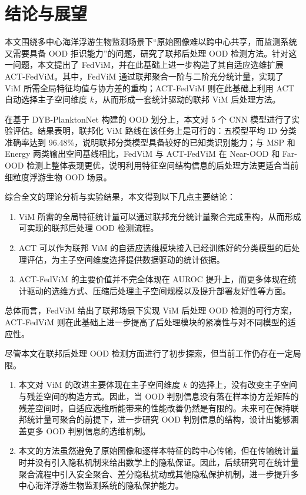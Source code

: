 
\chapter{结论与展望}

本文围绕多中心海洋浮游生物监测场景下“原始图像难以跨中心共享，而监测系统又需要具备 OOD 拒识能力”的问题，研究了联邦后处理 OOD 检测方法。针对这一问题，本文提出了 FedViM，并在此基础上进一步构造了其自适应选维扩展 ACT-FedViM。其中，FedViM 通过联邦聚合一阶与二阶充分统计量，实现了 ViM 所需全局特征均值与协方差的重构；ACT-FedViM 则在此基础上利用 ACT 自动选择主子空间维度 $k$，从而形成一套统计驱动的联邦 ViM 后处理方法。

在基于 DYB-PlanktonNet 构建的 OOD 划分上，本文对 5 个 CNN 模型进行了实验评估。结果表明，联邦化 ViM 路线在该任务上是可行的：五模型平均 ID 分类准确率达到 96.48\%，说明联邦分类模型具备较好的已知类识别能力；与 MSP 和 Energy 两类输出空间基线相比，FedViM 与 ACT-FedViM 在 Near-OOD 和 Far-OOD 检测上整体表现更优，说明利用特征空间结构信息的后处理方法更适合当前细粒度浮游生物 OOD 场景。

综合全文的理论分析与实验结果，本文得到以下几点主要结论：
\begin{enumerate}
  \item ViM 所需的全局特征统计量可以通过联邦充分统计量聚合完成重构，从而形成可实现的联邦后处理 OOD 检测流程。
  \item ACT 可以作为联邦 ViM 的自适应选维模块接入已经训练好的分类模型的后处理评估，为主子空间维度选择提供数据驱动的统计依据。
  \item ACT-FedViM 的主要价值并不完全体现在 AUROC 提升上，而更多体现在统计驱动的选维方式、压缩后处理主子空间规模以及提升部署友好性等方面。
\end{enumerate}

总体而言，FedViM 给出了联邦场景下实现 ViM 后处理 OOD 检测的可行方案，ACT-FedViM 则在此基础上进一步提高了后处理模块的紧凑性与对不同模型的适应性。

尽管本文在联邦后处理 OOD 检测方面进行了初步探索，但当前工作仍存在一定局限。
\begin{enumerate}
  \item 本文对 ViM 的改进主要体现在主子空间维度 $k$ 的选择上，没有改变主子空间与残差空间的构造方式。因此，当 OOD 判别信息没有落在样本协方差矩阵的残差空间时，自适应选维所能带来的性能改善仍然是有限的。未来可在保持联邦统计量可聚合的前提下，进一步研究 OOD 判别信息的结构，设计出能够涵盖更多 OOD 判别信息的选维机制。
  \item 本文的方法虽然避免了原始图像和逐样本特征的跨中心传输，但在传输统计量时并没有引入隐私机制来给出数学上的隐私保证。因此，后续研究可在统计量聚合流程中引入安全聚合、差分隐私扰动或其他隐私保护机制，进一步提升多中心海洋浮游生物监测系统的隐私保护能力。
\end{enumerate}
